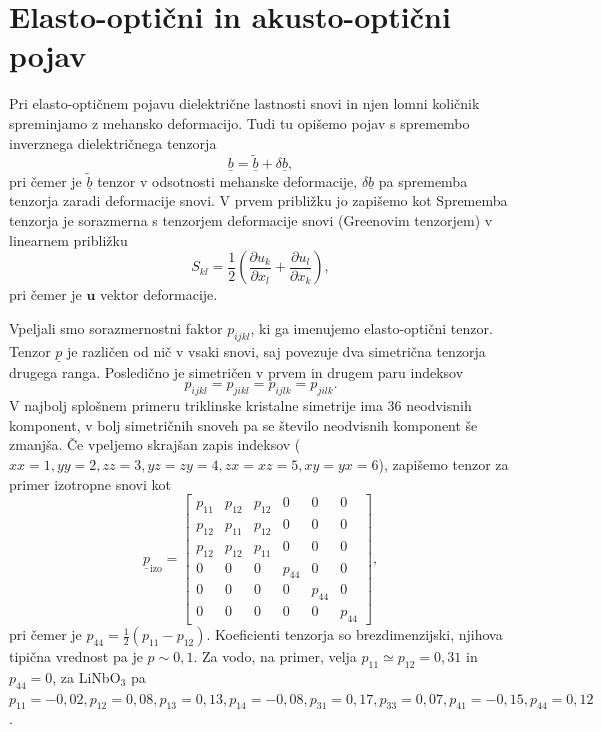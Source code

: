 \section{Elasto-optični in akusto-optični pojav}
Pri elasto-optičnem pojavu dielektrične lastnosti snovi in njen lomni količnik
spreminjamo z mehansko deformacijo. Tudi tu opišemo pojav
s spremembo inverznega dielektričnega tenzorja
\begin{equation}
\underline{b} = \underline{\tilde{b}}+ \delta\underline{b},
\end{equation}
pri čemer je $\underline{\tilde{b}}$ tenzor v odsotnosti mehanske deformacije, 
$\delta\underline{b}$ pa sprememba tenzorja zaradi deformacije snovi. V prvem približku jo zapišemo
kot
Sprememba tenzorja je sorazmerna s tenzorjem deformacije snovi (Greenovim tenzorjem) v
linearnem približku
\begin{equation}
S_{kl}=\frac{1}{2}\left({\frac{\partial u_{k}}{\partial x_{l}}}+{\frac{\partial u_{l}}{\partial x_{k}}}\right),
\label{7.28}
\end{equation}
pri čemer je $\mathbf{u}$ vektor deformacije. 

Vpeljali smo sorazmernostni faktor
$p_{ijkl}$, ki ga imenujemo elasto-optični tenzor. 
Tenzor $\underline{p}$ je različen od nič v vsaki snovi, saj povezuje dva simetrična tenzorja 
drugega ranga. Posledično je simetričen v prvem in drugem paru indeksov
\begin{equation}
p_{ijkl} = p_{jikl} = p_{ijlk} =p_{jilk}.
\end{equation}
V najbolj splošnem primeru triklinske kristalne simetrije 
ima 36 neodvisnih komponent, v bolj simetričnih snoveh pa se število 
neodvisnih komponent še zmanjša. Če vpeljemo skrajšan zapis indeksov ($xx = 1,
yy=2, zz = 3, yz = zy = 4, zx = xz = 5, xy = yx = 6$), zapišemo tenzor za primer izotropne snovi kot
\begin{equation}
\underline{p}_{\textrm{izo}} = 
\left[\begin{array}{cccccc}
p_{11} & p_{12}& p_{12}&0&0&0\\
p_{12} & p_{11}& p_{12}&0&0&0\\
p_{12} & p_{12}& p_{11}&0&0&0\\
0 & 0& 0&p_{44}&0&0\\
0 & 0& 0&0&p_{44}&0\\
0 & 0& 0&0&0&p_{44}
\end{array}\right],
\label{tenzorp}
\end{equation}
pri čemer je $p_{44}= \frac{1}{2}(p_{11}-p_{12})$. Koeficienti tenzorja so 
brezdimenzijski, njihova tipična vrednost pa je $p\sim0,1$. Za vodo, na primer, 
velja $p_{11} \simeq p_{12} = 0,31$ in $p_{44} = 0$, za LiNbO$_3$ pa $p_{11} = -0,02, 
p_{12} = 0,08, p_{13} = 0,13,  p_{14} = -0,08, p_{31} = 0,17, p_{33} = 0,07,
p_{41} = -0,15, p_{44} = 0,12$.

